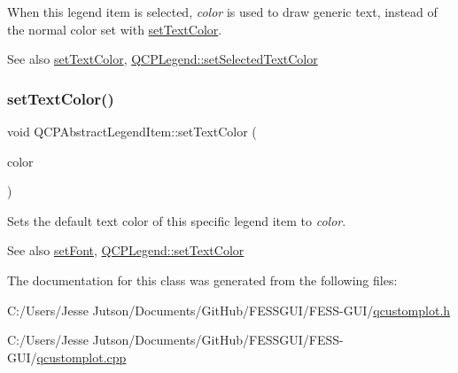 When this legend item is selected, {\itshape color} is used to draw generic text, instead of the normal color set with \hyperlink{class_q_c_p_abstract_legend_item_a6ebace6aaffaedcdab2d74e88acc2d1e}{set\+Text\+Color}.

\begin{DoxySeeAlso}{See also}
\hyperlink{class_q_c_p_abstract_legend_item_a6ebace6aaffaedcdab2d74e88acc2d1e}{set\+Text\+Color}, \hyperlink{class_q_c_p_legend_a7674dfc7a1f30e1abd1018c0ed45e0bc}{Q\+C\+P\+Legend\+::set\+Selected\+Text\+Color} 
\end{DoxySeeAlso}
\hypertarget{class_q_c_p_abstract_legend_item_a6ebace6aaffaedcdab2d74e88acc2d1e}{}\label{class_q_c_p_abstract_legend_item_a6ebace6aaffaedcdab2d74e88acc2d1e} 
\subsubsection{\texorpdfstring{set\+Text\+Color()}{setTextColor()}}
{\footnotesize\ttfamily void Q\+C\+P\+Abstract\+Legend\+Item\+::set\+Text\+Color (\begin{DoxyParamCaption}\item[{const Q\+Color \&}]{color }\end{DoxyParamCaption})}

Sets the default text color of this specific legend item to {\itshape color}.

\begin{DoxySeeAlso}{See also}
\hyperlink{class_q_c_p_abstract_legend_item_a409c53455d8112f71d70c0c43eb10265}{set\+Font}, \hyperlink{class_q_c_p_legend_ae1eb239ff4a4632fe1b6c3e668d845c6}{Q\+C\+P\+Legend\+::set\+Text\+Color} 
\end{DoxySeeAlso}


The documentation for this class was generated from the following files\+:\begin{DoxyCompactItemize}
\item 
C\+:/\+Users/\+Jesse Jutson/\+Documents/\+Git\+Hub/\+F\+E\+S\+S\+G\+U\+I/\+F\+E\+S\+S-\/\+G\+U\+I/\hyperlink{qcustomplot_8h}{qcustomplot.\+h}\item 
C\+:/\+Users/\+Jesse Jutson/\+Documents/\+Git\+Hub/\+F\+E\+S\+S\+G\+U\+I/\+F\+E\+S\+S-\/\+G\+U\+I/\hyperlink{qcustomplot_8cpp}{qcustomplot.\+cpp}\end{DoxyCompactItemize}
